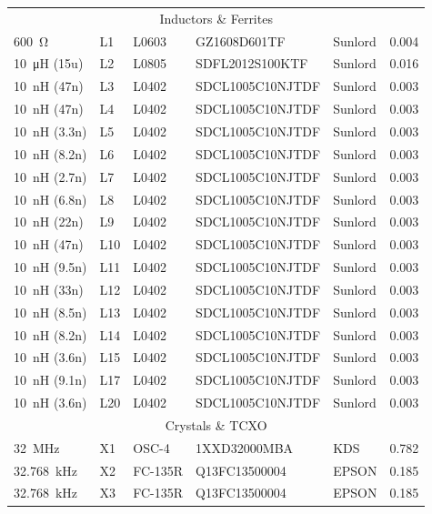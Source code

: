 \begin{appendices}
\begin{footnotesize}
\begin{longtable}{llllll}
    \multicolumn{6}{c}{\cellcolor[HTML]{EFEFEF}Inductors \& Ferrites} \\
    \SI{600}{\ohm} & L1 & L0603 & GZ1608D601TF & Sunlord & 0.004 \\
    \SI{10}{\micro\henry} (15u) & L2 & L0805 & SDFL2012S100KTF & Sunlord & 0.016 \\
    \SI{10}{\nano\henry} (47n) & L3 & L0402 & SDCL1005C10NJTDF & Sunlord & 0.003 \\
    \SI{10}{\nano\henry} (47n) & L4 & L0402 & SDCL1005C10NJTDF & Sunlord & 0.003 \\
    \SI{10}{\nano\henry} (3.3n) & L5 & L0402 & SDCL1005C10NJTDF & Sunlord & 0.003 \\
    \SI{10}{\nano\henry} (8.2n) & L6 & L0402 & SDCL1005C10NJTDF & Sunlord & 0.003 \\
    \SI{10}{\nano\henry} (2.7n) & L7 & L0402 & SDCL1005C10NJTDF & Sunlord & 0.003 \\
    \SI{10}{\nano\henry} (6.8n) & L8 & L0402 & SDCL1005C10NJTDF & Sunlord & 0.003 \\
    \SI{10}{\nano\henry} (22n) & L9 & L0402 & SDCL1005C10NJTDF & Sunlord & 0.003 \\
    \SI{10}{\nano\henry} (47n) & L10 & L0402 & SDCL1005C10NJTDF & Sunlord & 0.003 \\
    \SI{10}{\nano\henry} (9.5n) & L11 & L0402 & SDCL1005C10NJTDF & Sunlord & 0.003 \\
    \SI{10}{\nano\henry} (33n) & L12 & L0402 & SDCL1005C10NJTDF & Sunlord & 0.003 \\
    \SI{10}{\nano\henry} (8.5n) & L13 & L0402 & SDCL1005C10NJTDF & Sunlord & 0.003 \\
    \SI{10}{\nano\henry} (8.2n) & L14 & L0402 & SDCL1005C10NJTDF & Sunlord & 0.003 \\
    \SI{10}{\nano\henry} (3.6n) & L15 & L0402 & SDCL1005C10NJTDF & Sunlord & 0.003 \\
    \SI{10}{\nano\henry} (9.1n) & L17 & L0402 & SDCL1005C10NJTDF & Sunlord & 0.003 \\
    \SI{10}{\nano\henry} (3.6n) & L20 & L0402 & SDCL1005C10NJTDF & Sunlord & 0.003 \\
    
    \multicolumn{6}{c}{\cellcolor[HTML]{EFEFEF}Crystals \& \ac{TCXO}} \\
    \SI{32}{\mega\hertz} & X1 & OSC-4 & 1XXD32000MBA & KDS & 0.782 \\
    \SI{32.768}{\kilo\hertz} & X2 & FC-135R & Q13FC13500004 & EPSON & 0.185 \\
    \SI{32.768}{\kilo\hertz} & X3 & FC-135R & Q13FC13500004 & EPSON & 0.185 \\


\end{longtable}
\end{footnotesize}
\end{appendices}
